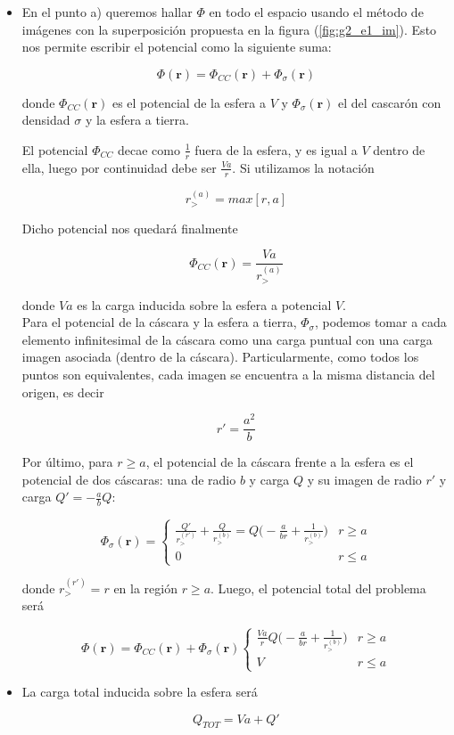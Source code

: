 \begin{itemize}
    \item En el punto a) queremos hallar $\Phi$ en todo el espacio usando el m\'etodo de im\'agenes con la superposici\'on propuesta en la figura (\ref{fig:g2_e1_im}). Esto nos permite escribir el potencial como la siguiente suma:

    $$\Phi(\mathbf{r}) = \Phi_{CC}(\mathbf{r}) + \Phi_{\sigma}(\mathbf{r})$$

    donde $\Phi_{CC}(\mathbf{r})$ es el potencial de la esfera a $V$ y $\Phi_{\sigma}(\mathbf{r})$ el del cascar\'on con densidad $\sigma$ y la esfera a tierra.

    El potencial $\Phi_{CC}$ decae como $\frac{1}{r}$ fuera de la esfera, y es igual a $V$ dentro de ella, luego por continuidad debe ser $\frac{Va}{r}$. Si utilizamos la notaci\'on  
    
    $$r_{>~}^{(a)} = max[r, a]$$

    Dicho potencial nos quedar\'a finalmente

    $$\Phi_{CC}(\mathbf{r}) = \frac{Va}{r_{>~}^{(a)}}$$

    donde $Va$ es la carga inducida sobre la esfera a potencial $V$.\\
    
    Para el potencial de la c\'ascara y la esfera a tierra, $\Phi_{\sigma}$, podemos tomar a cada elemento infinitesimal de la c\'ascara como una carga puntual con una carga imagen asociada (dentro de la c\'ascara). Particularmente, como todos los puntos son equivalentes, cada imagen se encuentra a la misma distancia del origen, es decir

    $$r' = \frac{a^{2}}{b}$$

    Por \'ultimo, para $r \geq a$, el potencial de la c\'ascara frente a la esfera es el potencial de dos c\'ascaras: una de radio $b$ y carga $Q$ y su imagen de radio $r'$ y carga $Q' = -\frac{a}{b}Q$:

    \[\Phi_{\sigma}(\mathbf{r})=
        \begin{cases}
            \frac{Q'}{r_{>~}^{(r')}} + \frac{Q}{r_{>~}^{(b)}} = Q\bigg(-\frac{a}{br} + \frac{1}{r_{>~}^{(b)}}\bigg) & r \geq a\\
            0  & r \leq a
        \end{cases}
    \]

    donde $r_{>~}^{(r')} = r$ en la regi\'on $r \geq a$. Luego, el potencial total del problema ser\'a

    \[\Phi(\mathbf{r}) = \Phi_{CC}(\mathbf{r}) + \Phi_{\sigma}(\mathbf{r})
        \begin{cases}
            \frac{Va}{r} Q\bigg(-\frac{a}{br} + \frac{1}{r_{>~}^{(b)}}\bigg) & r \geq a\\
            V & r \leq a
        \end{cases}
    \]

    \item La carga total inducida sobre la esfera ser\'a

    $$Q_{TOT} = Va + Q'$$
\end{itemize}

